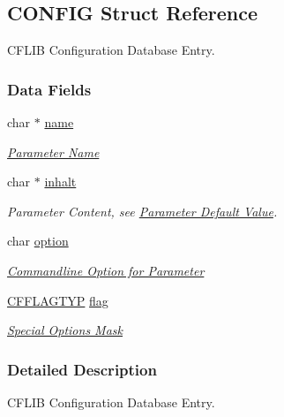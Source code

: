 \hypertarget{struct_c_o_n_f_i_g}{\subsection{C\-O\-N\-F\-I\-G Struct Reference}
\label{struct_c_o_n_f_i_g}
}


C\-F\-L\-I\-B Configuration Database Entry.  


\subsubsection*{Data Fields}
\begin{DoxyCompactItemize}
\item 
\hypertarget{struct_c_o_n_f_i_g_a196d63e311e3d1aa79fe4f16f20ce2a5}{char $\ast$ \hyperlink{struct_c_o_n_f_i_g_a196d63e311e3d1aa79fe4f16f20ce2a5}{name}}\label{struct_c_o_n_f_i_g_a196d63e311e3d1aa79fe4f16f20ce2a5}

\begin{DoxyCompactList}\small\item\em \hyperlink{config_initializer_parameter_name}{Parameter Name} \end{DoxyCompactList}\item 
\hypertarget{struct_c_o_n_f_i_g_ab8cae13203b07fabaa40e407fa8dbdfb}{char $\ast$ \hyperlink{struct_c_o_n_f_i_g_ab8cae13203b07fabaa40e407fa8dbdfb}{inhalt}}\label{struct_c_o_n_f_i_g_ab8cae13203b07fabaa40e407fa8dbdfb}

\begin{DoxyCompactList}\small\item\em Parameter Content, see \hyperlink{config_initializer_parameter_default}{Parameter Default Value}. \end{DoxyCompactList}\item 
\hypertarget{struct_c_o_n_f_i_g_a60563bd93e85c1ddb8291a2d27a9c472}{char \hyperlink{struct_c_o_n_f_i_g_a60563bd93e85c1ddb8291a2d27a9c472}{option}}\label{struct_c_o_n_f_i_g_a60563bd93e85c1ddb8291a2d27a9c472}

\begin{DoxyCompactList}\small\item\em \hyperlink{config_initializer_parameter_option}{Commandline Option for Parameter} \end{DoxyCompactList}\item 
\hypertarget{struct_c_o_n_f_i_g_ab04d08abdf758c0400caaded716f4089}{\hyperlink{group__special__options__mask_ga4854f1596d5c6e0604a478fa9a2e23f0}{C\-F\-F\-L\-A\-G\-T\-Y\-P} \hyperlink{struct_c_o_n_f_i_g_ab04d08abdf758c0400caaded716f4089}{flag}}\label{struct_c_o_n_f_i_g_ab04d08abdf758c0400caaded716f4089}

\begin{DoxyCompactList}\small\item\em \hyperlink{group__special__options__mask}{Special Options Mask} \end{DoxyCompactList}\end{DoxyCompactItemize}


\subsubsection{Detailed Description}
C\-F\-L\-I\-B Configuration Database Entry. 